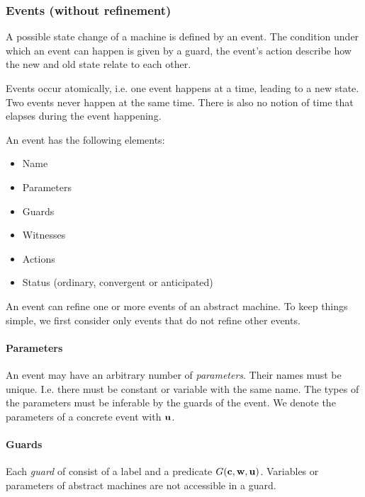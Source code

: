 \subsubsection{Events (without refinement)}
\label{events_no_refinement}
A possible state change of a machine is defined by an event.
The condition under which an event can happen is given by a guard, the event's action
describe how the new and old state relate to each other.

Events occur atomically, i.e. one event happens at a time, leading to a new state.
Two events never happen at the same time. There is also no notion of time that elapses
during the event happening.

An event has the following elements:
\begin{itemize}
\item Name
\item Parameters
\item Guards
\item Witnesses
\item Actions
\item Status (ordinary, convergent or anticipated)
\end{itemize}

An event can refine one or more events of an abstract machine. To keep things simple, we
  first consider only events that do not refine other events.

\paragraph{Parameters}
An event may have an arbitrary number of \emph{parameters}. Their names must be unique. 
I.e. there must be constant or variable with the same name.
The types of the parameters must be inferable by the guards of the event.
We denote the parameters of a concrete event with $\textbf{u}$.

\paragraph{Guards}
Each \emph{guard} of consist of a label and a predicate $G(\textbf{c},\textbf{w},\textbf{u})$.
Variables or parameters of abstract machines are not accessible in a guard.

